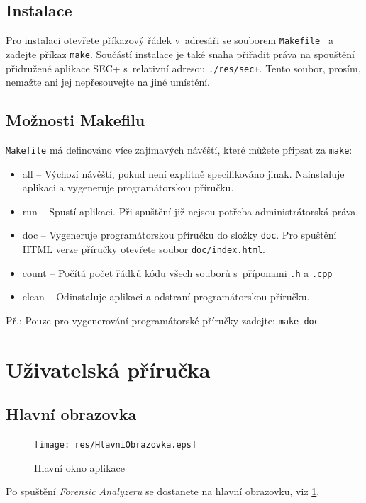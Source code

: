 \documentclass[a4paper,12pt]{article}
\begin{document}
\subsection{Instalace}
Pro instalaci otevřete příkazový řádek v~adresáři se souborem \texttt{Makefile } a zadejte příkaz \texttt{make}.
Součástí instalace je také snaha přiřadit práva na spouštění přidružené aplikace SEC+ s~relativní adresou \texttt{./res/sec+}. Tento soubor, prosím, nemažte ani jej nepřesouvejte na jiné umístění.

\subsection{Možnosti Makefilu}
\label{makefile}
\texttt{Makefile} má definováno více zajímavých návěští, které můžete připsat za \texttt{make}:
\begin{itemize}
	\item all -- Výchozí návěští, pokud není explitně specifikováno jinak. Nainstaluje aplikaci a vygeneruje programátorskou příručku.
	\item run -- Spustí aplikaci. Při spuštění již nejsou potřeba administrátorská práva.
	\item doc -- Vygeneruje programátorskou příručku do složky \texttt{doc}. Pro spuštění HTML verze příručky otevřete soubor \texttt{doc/index.html}.
	\item count -- Počítá počet řádků kódu všech souborů s~příponami \texttt{.h} a \texttt{.cpp}
	\item clean -- Odinstaluje aplikaci a odstraní programátorskou příručku.
\end{itemize}

Př.:
Pouze pro vygenerování programátorské příručky zadejte: \texttt{make doc}

\section{Uživatelská příručka}
\subsection{Hlavní obrazovka}
\begin{figure}[h]
  \centering
  \texttt{[image: res/HlavniObrazovka.eps]}
  \caption{Hlavní okno aplikace}
  \label{fig:HlavniOkno}
\end{figure}

Po spuštění \textit{Forensic Analyzeru} se dostanete na hlavní obrazovku, viz \ref{fig:HlavniOkno}.
\end{document}
